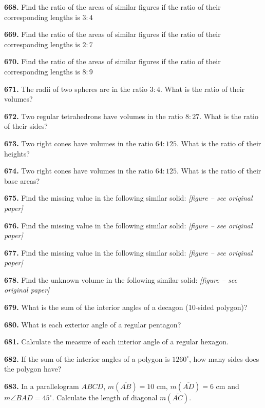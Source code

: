 \documentclass[11pt]{article}
\newcommand{\seg}[1]{\overline{#1}}
\begin{document}
\bigskip
\noindent\textbf{668.} Find the ratio of the areas of similar figures if the ratio of their corresponding lengths is $3:4$

\bigskip
\noindent\textbf{669.} Find the ratio of the areas of similar figures if the ratio of their corresponding lengths is $2:7$

\bigskip
\noindent\textbf{670.} Find the ratio of the areas of similar figures if the ratio of their corresponding lengths is $8:9$

\bigskip
\noindent\textbf{671.} The radii of two spheres are in the ratio $3:4$. What is the ratio of their volumes?

\bigskip
\noindent\textbf{672.} Two regular tetrahedrons have volumes in the ratio $8:27$. What is the ratio of their sides?

\bigskip
\noindent\textbf{673.} Two right cones have volumes in the ratio $64:125$. What is the ratio of their heights?

\bigskip
\noindent\textbf{674.} Two right cones have volumes in the ratio $64:125$. What is the ratio of their base areas?

\bigskip
\noindent\textbf{675.} Find the missing value in the following similar solid: \emph{[figure -- see original paper]}

\bigskip
\noindent\textbf{676.} Find the missing value in the following similar solid: \emph{[figure -- see original paper]}

\bigskip
\noindent\textbf{677.} Find the missing value in the following similar solid: \emph{[figure -- see original paper]}

\bigskip
\noindent\textbf{678.} Find the unknown volume in the following similar solid: \emph{[figure -- see original paper]}

\bigskip
\noindent\textbf{679.} What is the sum of the interior angles of a decagon (10-sided polygon)?

\bigskip
\noindent\textbf{680.} What is each exterior angle of a regular pentagon?

\bigskip
\noindent\textbf{681.} Calculate the measure of each interior angle of a regular hexagon.

\bigskip
\noindent\textbf{682.} If the sum of the interior angles of a polygon is $1260^{\circ}$, how many sides does the polygon have?

\bigskip
\noindent\textbf{683.} In a parallelogram $ABCD$, $m(\seg{AB})=10$ cm, $m(\seg{AD})=6$ cm and $m\angle BAD=45^{\circ}$. Calculate the length of diagonal $m(\seg{AC})$.
\end{document}
